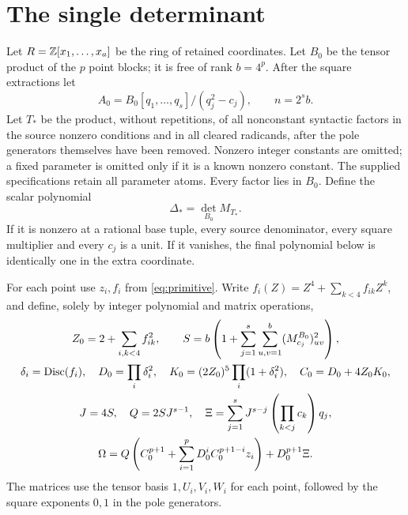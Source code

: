 \documentclass[11pt,a4paper]{article}
\theoremstyle{remark}\newtheorem{remark}[theorem]{Remark}
\begin{document}
\section{The single determinant}\label{sec:determinant}
Let $R=\mathbb Z[x_1,\ldots,x_a]$ be the ring of retained coordinates. Let
$B_0$ be the tensor product of the $p$ point blocks; it is free of rank
$b=4^p$. After the square extractions let
\[
 A_0=B_0[q_1,\ldots,q_s]/(q_j^2-c_j),\qquad n=2^sb.
\]
Let $T_*$ be the product, without repetitions, of all nonconstant
syntactic factors in the source nonzero conditions and in all cleared
radicands, after the pole generators themselves have been removed.
Nonzero integer constants are omitted; a fixed parameter is omitted
only if it is a known nonzero constant. The supplied specifications
retain all parameter atoms. Every factor lies in $B_0$.
Define the scalar polynomial
\begin{equation}\label{eq:normguard}
                         \Delta_* = \det_{B_0}M_{T_*}.
\end{equation}
If it is nonzero at a rational base tuple, every source denominator,
every square multiplier and every $c_j$ is a unit. If it vanishes, the
final polynomial below is identically one in the extra coordinate.

For each point use $z_i,f_i$ from \eqref{eq:primitive}. Write
$f_i(Z)=Z^4+\sum_{k<4}f_{ik}Z^k$, and define, solely by integer
polynomial and matrix operations,
\begin{equation}\label{eq:separator}
\begin{gathered}
 Z_0=2+\sum_{i,k<4}f_{ik}^2,\qquad
 S=b\left(1+\sum_{j=1}^s\sum_{u,v=1}^b(M_{c_j}^{B_0})_{uv}^2\right),\\
 \delta_i=\operatorname{Disc}(f_i),\quad D_0=\prod_i\delta_i^2,\quad
 K_0=(2Z_0)^5\prod_i(1+\delta_i^2),\quad C_0=D_0+4Z_0K_0,\\
 J=4S,\quad Q=2SJ^{s-1},\quad
 \Xi=\sum_{j=1}^s J^{s-j}\left(\prod_{k<j}c_k\right)q_j,\\
 \Omega=Q\left(C_0^{p+1}+\sum_{i=1}^pD_0^iC_0^{p+1-i}z_i\right)
                      +D_0^{p+1}\Xi.
\end{gathered}
\end{equation}
The matrices use the tensor basis $1,U_i,V_i,W_i$ for each point,
followed by the square exponents $0,1$ in the pole generators.
\end{document}
